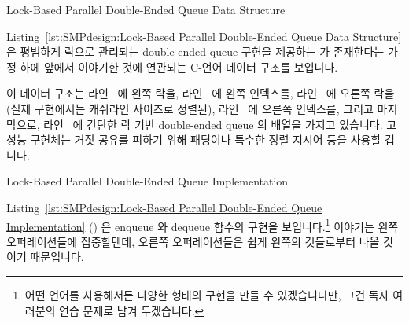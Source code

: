 \fi

\begin{listing}[tbp]

\caption{Lock-Based Parallel Double-Ended Queue Data Structure}
\label{lst:SMPdesign:Lock-Based Parallel Double-Ended Queue Data Structure}
\end{listing}

Listing~\ref{lst:SMPdesign:Lock-Based Parallel Double-Ended Queue Data Structure}
은 평범하게 락으로 관리되는 double-ended-queue 구현을 제공하는 
가 존재한다는 가정 하에 앞에서 이야기한 것에 연관되는 C-언어 데이터 구조를
보입니다.
\begin{fcvref}
이 데이터 구조는 라인~ 에 왼쪽 락을, 라인~ 에 왼쪽
인덱스를, 라인~ 에 오른쪽 락을 (실제 구현에서는 캐쉬라인 사이즈로
정렬된), 라인~ 에 오른쪽 인덱스를, 그리고 마지막으로,
라인~ 에 간단한 락 기반 double-ended queue 의 배열을 가지고
있습니다.
고성능 구현체는 거짓 공유를 피하기 위해 패딩이나 특수한 정렬 지시어 등을 사용할
겁니다.
\end{fcvref}

\begin{listing}[tbp]

\caption{Lock-Based Parallel Double-Ended Queue Implementation}
\label{lst:SMPdesign:Lock-Based Parallel Double-Ended Queue Implementation}
\end{listing}

Listing~\ref{lst:SMPdesign:Lock-Based Parallel Double-Ended Queue Implementation}
()
은 enqueue 와 dequeue 함수의 구현을 보입니다.\footnote{
	어떤 언어를 사용해서든 다양한 형태의 구현을 만들 수 있겠습니다만, 그건
	독자 여러분의 연습 문제로 남겨 두겠습니다.}
이야기는 왼쪽 오퍼레이션들에 집중할텐데, 오른쪽 오퍼레이션들은 쉽게 왼쪽의
것들로부터 나올 것이기 때문입니다.

